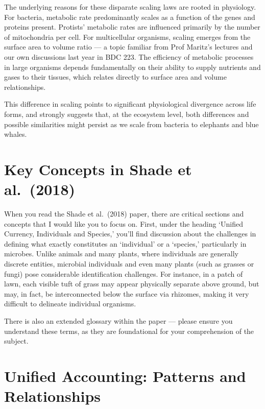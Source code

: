 \documentclass[
  10pt,
]{book}
\begin{document}
The underlying reasons for these disparate scaling laws are rooted in
physiology. For bacteria, metabolic rate predominantly scales as a
function of the genes and proteins present. Protists' metabolic rates
are influenced primarily by the number of mitochondria per cell. For
multicellular organisms, scaling emerges from the surface area to volume
ratio --- a topic familiar from Prof Maritz's lectures and our own
discussions last year in BDC 223. The efficiency of metabolic processes
in large organisms depends fundamentally on their ability to supply
nutrients and gases to their tissues, which relates directly to surface
area and volume relationships.

This difference in scaling points to significant physiological
divergence across life forms, and strongly suggests that, at the
ecosystem level, both differences and possible similarities might
persist as we scale from bacteria to elephants and blue whales.

\section{Key Concepts in Shade et
al.~(2018)}\label{key-concepts-in-shade-et-al.-2018}

When you read the Shade et al.~(2018) paper, there are critical sections
and concepts that I would like you to focus on. First, under the heading
`Unified Currency, Individuals and Species,' you'll find discussion
about the challenges in defining what exactly constitutes an
`individual' or a `species,' particularly in microbes. Unlike animals
and many plants, where individuals are generally discrete entities,
microbial individuals and even many plants (such as grasses or fungi)
pose considerable identification challenges. For instance, in a patch of
lawn, each visible tuft of grass may appear physically separate above
ground, but may, in fact, be interconnected below the surface via
rhizomes, making it very difficult to delineate individual organisms.

There is also an extended glossary within the paper --- please ensure
you understand these terms, as they are foundational for your
comprehension of the subject.

\section{Unified Accounting: Patterns and
Relationships}\label{unified-accounting-patterns-and-relationships}
\end{document}
